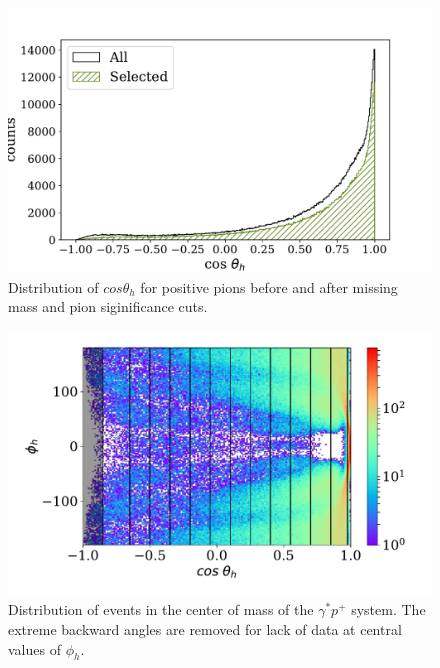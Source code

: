 \begin{figure}
  \begin{center}
    \includegraphics[width=\columnwidth]{image/cos_theta_h.pdf}
    \caption{Distribution of $cos \theta_h$ for positive pions before and after missing mass and pion siginificance cuts.}
  \end{center}
\end{figure}


\begin{figure}
  \begin{center}
    \includegraphics[width=\columnwidth]{image/cos_theta_h_phi_h_binned.pdf}
    \caption{Distribution of events in the center of mass of the $\gamma^* p^+$ system.  The extreme backward angles are removed for lack of data at central values of $\phi_h$.}
  \end{center}
\end{figure}

